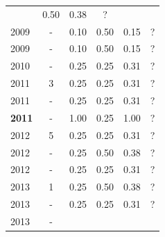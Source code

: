 \begin{table}[H]
\begin{tabular}{| l | c | c | c | c | c |}
          &
          0.50
          &
            {\color{red} 0.38}
          &
          ?
          \\
            2009
          &
          -
          &
          0.10
          &
          0.50
          &
            {\color{red} 0.15}
          &
          ?
          \\
            2009
          &
          -
          &
          0.10
          &
          0.50
          &
            {\color{red} 0.15}
          &
          ?
          \\
\hline
            2010
          &
          -
          &
          0.25
          &
          0.25
          &
            {\color{red} 0.31}
          &
          ?
          \\
\hline
            2011
          &
          3
          &
          0.25
          &
          0.25
          &
            {\color{red} 0.31}
          &
          ?
          \\
            2011
          &
          -
          &
          0.25
          &
          0.25
          &
            {\color{red} 0.31}
          &
          ?
          \\
            {\bf 2011}
          &
          -
          &
          1.00
          &
          0.25
          &
            {\color{blue} 1.00}
          &
          ?
          \\
\hline
            2012
          &
          5
          &
          0.25
          &
          0.25
          &
            {\color{red} 0.31}
          &
          ?
          \\
            2012
          &
          -
          &
          0.25
          &
          0.50
          &
            {\color{red} 0.38}
          &
          ?
          \\
            2012
          &
          -
          &
          0.25
          &
          0.25
          &
            {\color{red} 0.31}
          &
          ?
          \\
\hline
            2013
          &
          1
          &
          0.25
          &
          0.50
          &
            {\color{red} 0.38}
          &
          ?
          \\
            2013
          &
          -
          &
          0.25
          &
          0.25
          &
            {\color{red} 0.31}
          &
          ?
          \\
            2013
          &
          -
          &

\end{tabular}
\end{table}
